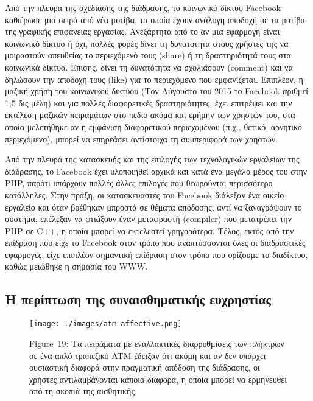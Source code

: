 \documentclass[
]{article}
\begin{document}
Από την πλευρά της σχεδίασης της διάδρασης, το κοινωνικό δίκτυο Facebook
καθιέρωσε μια σειρά από νέα μοτίβα, τα οποία έχουν ανάλογη αποδοχή με τα
μοτίβα της γραφικής επιφάνειας εργασίας. Ανεξάρτητα από το αν μια
εφαρμογή είναι κοινωνικό δίκτυο ή όχι, πολλές φορές δίνει τη δυνατότητα
στους χρήστες της να μοιραστούν απευθείας το περιεχόμενό τους (share) ή
τη δραστηριότητά τους στα κοινωνικά δίκτυα. Επίσης, δίνει τη δυνατότητα
να σχολιάσουν (comment) και να δηλώσουν την αποδοχή τους (like) για το
περιεχόμενο που εμφανίζεται. Επιπλέον, η μαζική χρήση του κοινωνικού
δικτύου (Τον Αύγουστο του 2015 το Facebook αριθμεί 1,5 δις μέλη) και για
πολλές διαφορετικές δραστηριότητες, έχει επιτρέψει και την εκτέλεση
μαζικών πειραμάτων στο πεδίο ακόμα και ερήμην των χρηστών του, στα οποία
μελετήθηκε αν η εμφάνιση διαφορετικού περιεχομένου (π.χ., θετικό,
αρνητικό περιεχόμενο), μπορεί να επηρεάσει αντίστοιχα τη συμπεριφορά των
χρηστών.

Από την πλευρά της κατασκευής και της επιλογής των τεχνολογικών
εργαλείων της διάδρασης, το Facebook έχει υλοποιηθεί αρχικά και κατά ένα
μεγάλο μέρος του στην PHP, παρότι υπάρχουν πολλές άλλες επιλογές που
θεωρούνται περισσότερο κατάλληλες. Στην πράξη, οι κατασκευαστές του
Facebook διάλεξαν ένα οικείο εργαλείο και όταν βρέθηκαν μπροστά σε
θέματα απόδοσης, αντί να ξαναγράψουν το σύστημα, επέλεξαν να φτιάξουν
έναν μεταφραστή (compiler) που μετατρέπει την PHP σε C++, η οποία μπορεί
να εκτελεστεί γρηγορότερα. Τέλος, εκτός από την επίδραση που είχε το
Facebook στον τρόπο που αναπτύσσονται όλες οι διαδραστικές εφαρμογές,
είχε επιπλέον σημαντική επίδραση στον τρόπο που ορίζουμε το διαδίκτυο,
καθώς μειώθηκε η σημασία του WWW.

\hypertarget{ux3b7-ux3c0ux3b5ux3c1ux3afux3c0ux3c4ux3c9ux3c3ux3b7-ux3c4ux3b7ux3c2-ux3c3ux3c5ux3bdux3b1ux3b9ux3c3ux3b8ux3b7ux3bcux3b1ux3c4ux3b9ux3baux3aeux3c2-ux3b5ux3c5ux3c7ux3c1ux3b7ux3c3ux3c4ux3afux3b1ux3c2}{%
\subsection{Η περίπτωση της συναισθηματικής
ευχρηστίας}\label{ux3b7-ux3c0ux3b5ux3c1ux3afux3c0ux3c4ux3c9ux3c3ux3b7-ux3c4ux3b7ux3c2-ux3c3ux3c5ux3bdux3b1ux3b9ux3c3ux3b8ux3b7ux3bcux3b1ux3c4ux3b9ux3baux3aeux3c2-ux3b5ux3c5ux3c7ux3c1ux3b7ux3c3ux3c4ux3afux3b1ux3c2}}

\leavevmode{}%
\begin{figure}
\hypertarget{fig:atm-affective}{%
\centering
\texttt{[image: ./images/atm-affective.png]}
\caption{Figure~19: Τα πειράματα με εναλλακτικές διαρρυθμίσεις των
πλήκτρων σε ένα απλό τραπεζικό ATM έδειξαν ότι ακόμη και αν δεν υπάρχει
ουσιαστική διαφορά στην πραγματική απόδοση της διάδρασης, οι χρήστες
αντιλαμβάνονται κάποια διαφορά, η οποία μπορεί να ερμηνευθεί από τη
σκοπιά της αισθητικής.}\label{fig:atm-affective}
}
\end{figure}
\end{document}
